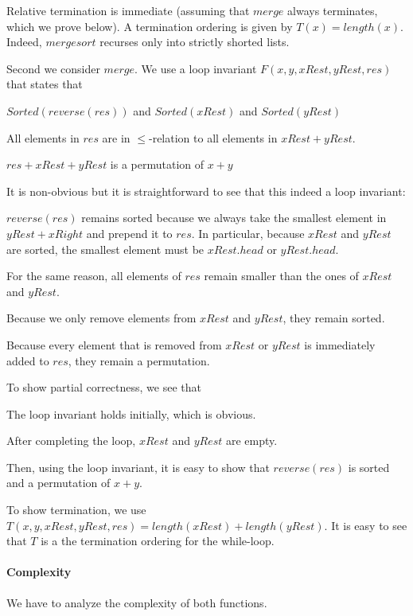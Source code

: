 Relative termination is immediate (assuming that $merge$ always terminates, which we prove below).
A termination ordering is given by $T(x)=length(x)$.
Indeed, $mergesort$ recurses only into strictly shorted lists.
\medskip

Second we consider $merge$.
We use a loop invariant $F(x,y,xRest,yRest,res)$ that states that
 \begin{compactitem}
  \item $Sorted(reverse(res))$ and $Sorted(xRest)$ and $Sorted(yRest)$
  \item All elements in $res$ are in $\leq$-relation to all elements in $xRest+yRest$.
  \item $res+xRest+yRest$ is a permutation of $x+y$
 \end{compactitem}
It is non-obvious but it is straightforward to see that this indeed a loop invariant:
 \begin{compactitem}
   \item $reverse(res)$ remains sorted because we always take the smallest element in $yRest+xRight$ and prepend it to $res$.
    In particular, because $xRest$ and $yRest$ are sorted, the smallest element must be $xRest.head$ or $yRest.head$.
   \item For the same reason, all elements of $res$ remain smaller than the ones of $xRest$ and $yRest$.
   \item Because we only remove elements from $xRest$ and $yRest$, they remain sorted.
   \item Because every element that is removed from $xRest$ or $yRest$ is immediately added to $res$, they remain a permutation.
 \end{compactitem}

To show partial correctness, we see that
\begin{compactitem}
  \item The loop invariant holds initially, which is obvious.
  \item After completing the loop, $xRest$ and $yRest$ are empty.
  \item Then, using the loop invariant, it is easy to show that $reverse(res)$ is sorted and a permutation of $x+y$.
\end{compactitem}

To show termination, we use $T(x,y,xRest,yRest,res)=length(xRest)+length(yRest)$.
It is easy to see that $T$ is a the termination ordering for the while-loop.

\paragraph{Complexity}
We have to analyze the complexity of both functions.

